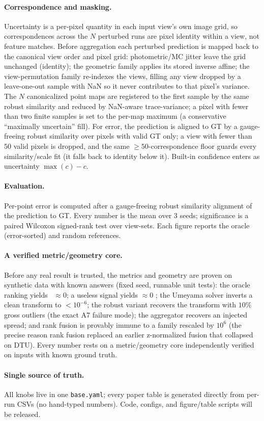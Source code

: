 \paragraph{Correspondence and masking.} Uncertainty is a per-pixel quantity in each input view's own
image grid, so correspondences across the $N$ perturbed runs are pixel identity within a view, not
feature matches. Before aggregation each perturbed prediction is mapped back to the canonical view
order and pixel grid: photometric/MC jitter leave the grid unchanged (identity); the geometric family
applies its stored inverse affine; the view-permutation family re-indexes the views, filling any view
dropped by a leave-one-out sample with NaN so it never contributes to that pixel's variance. The $N$
canonicalized point maps are registered to the first sample by the same robust similarity and reduced
by NaN-aware trace-variance; a pixel with fewer than two finite samples is set to the per-map maximum
(a conservative ``maximally uncertain'' fill). For error, the prediction is aligned to GT by a
gauge-freeing robust similarity over pixels with valid GT only; a view with fewer than $50$ valid
pixels is dropped, and the same $\ge\!50$-correspondence floor guards every similarity/scale fit (it
falls back to identity below it). Built-in confidence enters as uncertainty $\max(c)-c$.

\paragraph{Evaluation.} Per-point error is computed after a gauge-freeing robust similarity alignment
of the prediction to GT. Every number is the mean over $3$ seeds; significance is a paired Wilcoxon
signed-rank test over view-sets. Each figure reports the oracle (error-sorted) and random references.

\paragraph{A verified metric/geometry core.} Before any real result is trusted, the metrics and
geometry are proven on synthetic data with known answers (fixed seed, runnable unit tests): the
oracle ranking yields \ause\ $\approx 0$; a useless signal yields $\approx 0$ \aurg; the Umeyama
solver inverts a clean transform to $<10^{-6}$; the robust variant recovers the transform with $10\%$
gross outliers (the exact A7 failure mode); the aggregator recovers an injected spread; and rank
fusion is provably immune to a family rescaled by $10^6$ (the precise reason rank fusion replaced an
earlier z-normalized fusion that collapsed on DTU). Every number rests on a metric/geometry core
independently verified on inputs with known ground truth.

\paragraph{Single source of truth.} All knobs live in one \texttt{base.yaml}; every paper table is
generated directly from per-run CSVs (no hand-typed numbers). Code, configs, and figure/table scripts
will be released.
